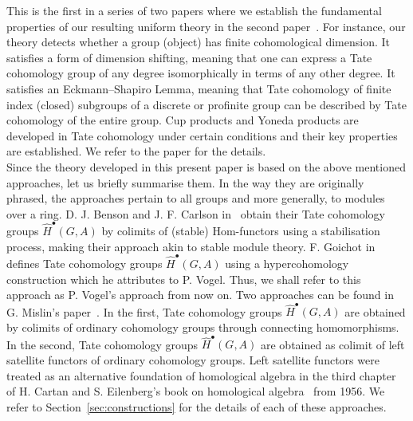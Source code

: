 \documentclass[12pt,a4paper]{article}
\numberwithin{equation}{section}
\theoremstyle{nonumberplain}
\begin{document}
This is the first in a series of two papers where we establish the fundamental properties of our resulting uniform theory in the second paper~\cite{ghe24}. For instance, our theory detects whether a group (object) has finite cohomological dimension. It satisfies a form of dimension shifting, meaning that one can express a Tate cohomology group of any degree isomorphically in terms of any other degree. It satisfies an Eckmann–Shapiro Lemma, meaning that Tate cohomology of finite index (closed) subgroups of a discrete or profinite group can be described by Tate cohomology of the entire group. Cup products and Yoneda products are developed in Tate cohomology under certain conditions and their key properties are established. We refer to the paper for the details. \\

Since the theory developed in this present paper is based on the above mentioned approaches, let us briefly summarise them. In the way they are originally phrased, the approaches pertain to all groups and more generally, to modules over a ring. D.\! J.\! Benson and J.\! F.\! Carlson in~\cite{ben92} obtain their Tate cohomology groups $\widehat{H}^{\bullet}(G, A)$ by colimits of (stable) Hom-functors using a stabilisation process, making their approach akin to stable module theory. F.\! Goichot in~\cite{goi92} defines Tate cohomology groups $\widehat{H}^{\bullet}(G, A)$ using a hypercohomology construction which he attributes to P.\! Vogel. Thus, we shall refer to this approach as P.\! Vogel's approach from now on. Two approaches can be found in G.\! Mislin's paper~\cite{mis94}. In the first, Tate cohomology groups $\widehat{H}^{\bullet}(G, A)$ are obtained by colimits of ordinary cohomology groups through connecting homomorphisms. In the second, Tate cohomology groups $\widehat{H}^{\bullet}(G, A)$ are obtained as colimit of left satellite functors of ordinary cohomology groups. Left satellite functors were treated as an alternative foundation of homological algebra in the third chapter of H.\! Cartan and S.\! Eilenberg's book on homological algebra~\cite{car56} from 1956. We refer to Section~\ref{sec:constructions} for the details of each of these approaches. \\
\end{document}
